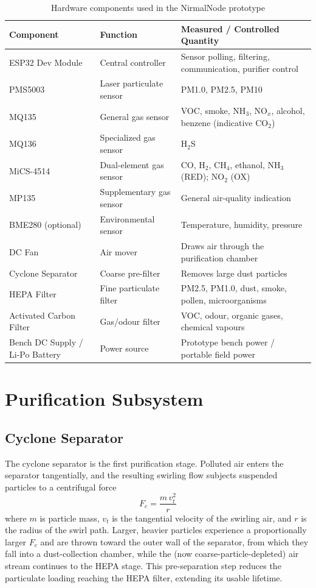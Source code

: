 \begin{table}[htbp]
\centering
\caption{Hardware components used in the NirmalNode prototype}
\label{tab:hardware-components}
\small
\begin{tabular}{@{}p{3.4cm}p{5.2cm}p{5.2cm}@{}}
\toprule
\textbf{Component} & \textbf{Function} & \textbf{Measured / Controlled Quantity} \\
\midrule
ESP32 Dev Module & Central controller & Sensor polling, filtering, communication, purifier control \\
PMS5003 & Laser particulate sensor & PM1.0, PM2.5, PM10 \\
MQ135 & General gas sensor & VOC, smoke, NH$_3$, NO$_x$, alcohol, benzene (indicative CO$_2$) \\
MQ136 & Specialized gas sensor & H$_2$S \\
MiCS-4514 & Dual-element gas sensor & CO, H$_2$, CH$_4$, ethanol, NH$_3$ (RED); NO$_2$ (OX) \\
MP135 & Supplementary gas sensor & General air-quality indication \\
BME280 (optional) & Environmental sensor & Temperature, humidity, pressure \\
DC Fan & Air mover & Draws air through the purification chamber \\
Cyclone Separator & Coarse pre-filter & Removes large dust particles \\
HEPA Filter & Fine particulate filter & PM2.5, PM1.0, dust, smoke, pollen, microorganisms \\
Activated Carbon Filter & Gas/odour filter & VOC, odour, organic gases, chemical vapours \\
Bench DC Supply / Li-Po Battery & Power source & Prototype bench power / portable field power \\
\bottomrule
\end{tabular}
\end{table}

\FloatBarrier

\section{Purification Subsystem}
\label{sec:meth-purification}

\subsection{Cyclone Separator}
The cyclone separator is the first purification stage. Polluted air enters the separator tangentially, and the resulting swirling flow subjects suspended particles to a centrifugal force
\begin{equation}
F_c = \frac{m\,v_t^2}{r}
\label{eq:centrifugal}
\end{equation}
where $m$ is particle mass, $v_t$ is the tangential velocity of the swirling air, and $r$ is the radius of the swirl path. Larger, heavier particles experience a proportionally larger $F_c$ and are thrown toward the outer wall of the separator, from which they fall into a dust-collection chamber, while the (now coarse-particle-depleted) air stream continues to the HEPA stage. This pre-separation step reduces the particulate loading reaching the HEPA filter, extending its usable lifetime.

